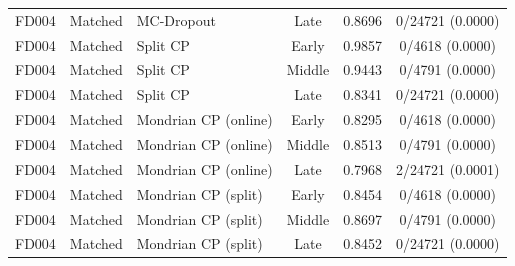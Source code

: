 \begin{table}[t]
\begin{tabular}{lllccc}
FD004 & Matched & MC-Dropout & Late & 0.8696 & 0/24721 (0.0000) \\
FD004 & Matched & Split CP & Early & 0.9857 & 0/4618 (0.0000) \\
FD004 & Matched & Split CP & Middle & 0.9443 & 0/4791 (0.0000) \\
FD004 & Matched & Split CP & Late & 0.8341 & 0/24721 (0.0000) \\
FD004 & Matched & Mondrian CP (online) & Early & 0.8295 & 0/4618 (0.0000) \\
FD004 & Matched & Mondrian CP (online) & Middle & 0.8513 & 0/4791 (0.0000) \\
FD004 & Matched & Mondrian CP (online) & Late & 0.7968 & 2/24721 (0.0001) \\
FD004 & Matched & Mondrian CP (split) & Early & 0.8454 & 0/4618 (0.0000) \\
FD004 & Matched & Mondrian CP (split) & Middle & 0.8697 & 0/4791 (0.0000) \\
FD004 & Matched & Mondrian CP (split) & Late & 0.8452 & 0/24721 (0.0000) \\
\bottomrule
\end{tabular}
\end{table}

